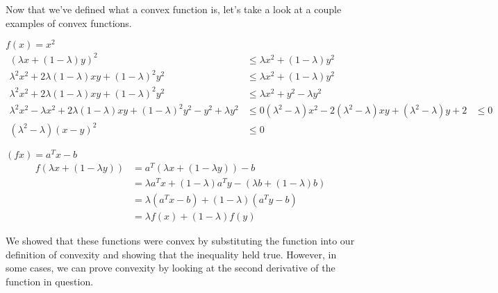 \documentclass[11pt]{article}
\begin{document}
Now that we've defined what a convex function is, let's take a look at a couple examples of convex functions.
\begin{list}{•}{•}
\item $f(x) = x^{2}$
\begin{align*}
(\lambda x + (1-\lambda)y)^{2} &\leq \lambda x^2 + (1-\lambda)y^{2}\\
\lambda^{2} x^{2} +2\lambda(1-\lambda)xy +  (1-\lambda)^{2}y^{2} &\leq \lambda x^2 + (1-\lambda)y^{2}\\
\lambda^{2} x^{2} + 2\lambda(1-\lambda)xy  + (1-\lambda)^{2}y^{2}&\leq \lambda x^2 + y^{2} -\lambda y^{2}\\
\lambda^{2} x^{2} - \lambda x^2 + 2\lambda(1-\lambda)xy  + (1-\lambda)^{2}y^{2} -y^{2} +\lambda y^{2} &\leq 0
(\lambda^{2}-\lambda)x^{2} - 2(\lambda^{2}-\lambda)xy + (\lambda^{2}-\lambda)y+{2}&\leq 0\\
(\lambda^{2}-\lambda)(x-y)^{2} &\leq 0
\end{align*}

\item $(fx) = a^{T}x -b$
\begin{align*}
f(\lambda x + (1-\lambda y)) &= a^{T}(\lambda x + (1-\lambda y)) - b\\
&= \lambda a^{T}x + (1-\lambda) a^{T}y - (\lambda b + (1-\lambda) b)\\
&= \lambda (a^{T} x - b) + (1 - \lambda)(a^{T} y - b)\\
&= \lambda f(x) + (1- \lambda) f(y)
\end{align*}

\end{list}

We showed that these functions were convex by substituting the function into our definition of convexity and showing that the inequality held true.  However, in some cases, we can prove convexity by looking at the second derivative of the function in question.
\end{document}

